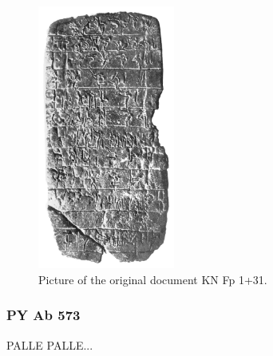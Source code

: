 \begin{figure}[H]
  \centering
  \includegraphics[width=0.4\textwidth]{Images/4088.png} %
  \caption{Picture of the original document KN Fp 1+31.}
  \label{fig:doc8}
\end{figure}

\subsubsection{PY Ab 573}
PALLE PALLE...

